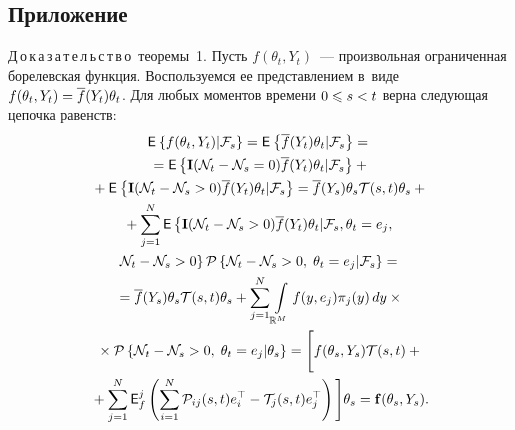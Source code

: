 \begin{multicols}{2}
  
{\small \section*{\raggedleft Приложение}
  \noindent
  Д\,о\,к\,а\,з\,а\,т\,е\,л\,ь\,с\,т\,в\,о\  теоремы~1.
Пусть $f(\theta_t,Y_t)$~--- произвольная 
ограниченная борелевская функция. Воспользуемся ее представлением в~виде 
$f(\theta_t,Y_t) \hm= \overline{f}(Y_t)\theta_t$. Для любых моментов времени $0 \hm\leqslant s \hm< t $ верна следующая цепочка равенств:
\begin{multline*}
\mathsf{E}_{  }\left\{ \mathop{f(\theta_t,Y_t)|{\mathcal F}_s} \right\} =\mathsf{E}_{  }\left\{ \mathop{\overline{f}(Y_t)\theta_t|{\mathcal F}_s} \right\}={} 
\\
{}={\sf E}\left\{\mathbf{I}({\mathcal N}_t - {\mathcal N}_s = 0)\overline{f}(Y_t)\theta_t|{\mathcal F}_s\right\} +{}\\
{}+
\mathsf{E}_{  }\left\{ \mathop{\mathbf{I}({\mathcal N}_t - {\mathcal N}_s > 0)\overline{f}(Y_t)\theta_t|{\mathcal F}_s} \right\} =
\overline{f}(Y_s)\theta_s\mathcal{T}(s, t)\theta_s + {}\\ 
{}+   
    \sum\limits_{j=1}^N {\mathsf E} \left\{\mathbf{I}({\mathcal N}_t - {\mathcal N}_s > 0)\overline{f}(Y_t)\theta_t 
|{\mathcal F}_s, \theta_t = e_j,\right.\\
 \left.{\mathcal N}_t - {\mathcal N}_s > 0\right\} \mathcal{P}\left\{ {\mathcal N}_t - {\mathcal N}_s > 0,\; \theta_t = e_j| 
{\mathcal F}_s \right\} ={} \\
{}=
\overline{f}(Y_s)\theta_s\mathcal{T}(s, t)\theta_s +
    \sum\limits_{j=1}^N  \int\limits_{\mathbb{R}^M} f(y, e_j)\pi_j(y)\,dy \times{}\\
    {}\times 
    \mathcal{P}\left\{ {\mathcal N}_t - {\mathcal N}_s > 0,\; \theta_t = e_j | \theta_s \right\} ={}
          \Bigg[ f(\theta_s,Y_s)
    \mathcal{T}(s, t)+{}\\
    {}+\sum\limits_{j=1}^N {\mathsf E}_f^{j} \left(\sum\limits_{i=1}^N 
\mathcal{P}_{ij}(s, t)e_i^\top - \mathcal{T}_j(s, t) e_j^\top\right)
    \Bigg]\theta_s = \mathbf{f}(\theta_s, Y_s).
\end{multline*}

}
\end{multicols}
